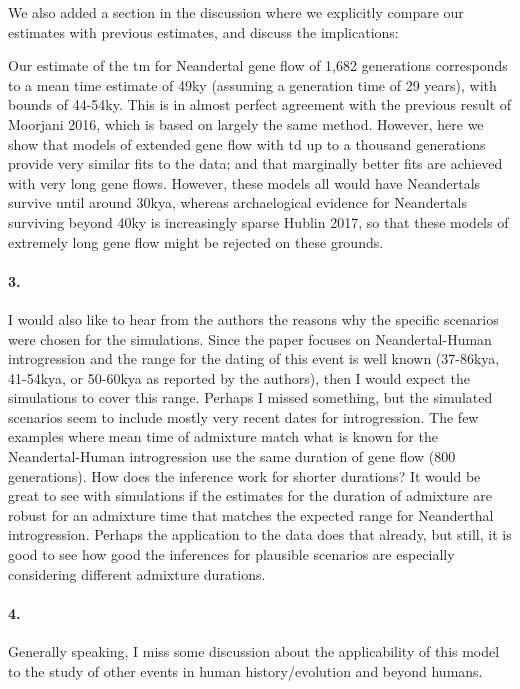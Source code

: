 \documentclass[11pt]{article}
\let\oldparagraph\paragraph
\renewcommand{\paragraph}[1]{\oldparagraph{#1}\mbox{}}
\begin{document}
We also added a section in the discussion where we explicitly compare our estimates with previous estimates, and discuss the implications:

\begin{mdframed}[hidealllines=true,backgroundcolor=grey!20]
Our estimate of the tm for Neandertal gene flow of 1,682 generations corresponds to a mean time estimate of 49ky (assuming a generation time of 29 years), with bounds of 44-54ky. This is in almost perfect agreement with the previous result of Moorjani 2016, which is based on largely the same method. However, here we show that models of extended gene flow with td up to a thousand generations provide very similar fits to the data; and that marginally better fits are achieved with very long gene flows. However, these models all would have Neandertals survive until around 30kya, whereas archaelogical evidence for Neandertals surviving beyond 40ky is increasingly sparse Hublin 2017, so that these models of extremely long gene flow might be rejected on these grounds.\end{mdframed}

\paragraph{3.}
I would also like to hear from the authors the reasons why the specific scenarios were chosen for the simulations. Since the paper focuses on Neandertal-Human introgression and the range for the dating of this event is well known (37-86kya, 41-54kya, or 50-60kya as reported by the authors), then I would expect the simulations to cover this range. Perhaps I missed something, but the simulated scenarios seem to include mostly very recent dates for introgression. The few examples where mean time of admixture match what is known for the Neandertal-Human introgression use the same duration of gene flow (800 generations). How does the inference work for shorter durations? It would be great to see with simulations if the estimates for the duration of admixture are robust for an admixture time that matches the expected range for Neanderthal introgression. Perhaps the application to the data does that already, but still, it is good to see how good the inferences for plausible scenarios are especially considering different admixture durations.

\paragraph{4.}
Generally speaking, I miss some discussion about the applicability of this model to the study of other events in human history/evolution and beyond humans.
\end{document}
